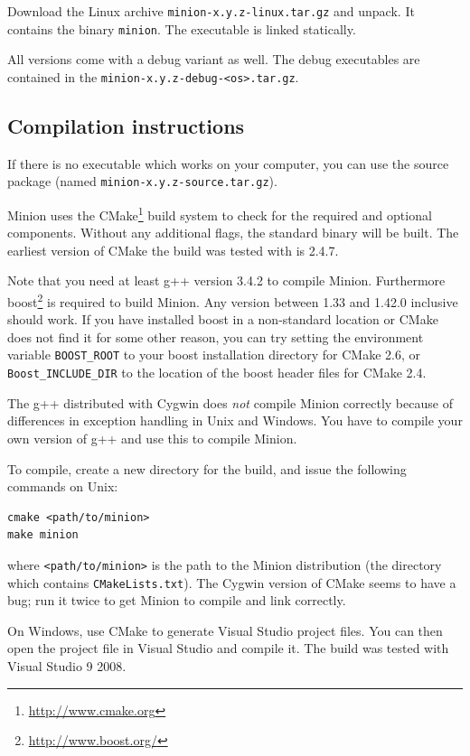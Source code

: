 \documentclass[oneside]{book}
\begin{document}
Download the Linux archive \texttt{minion-x.y.z-linux.tar.gz} and unpack. It contains
the binary \texttt{minion}. The executable is linked statically.

\bigskip

All versions come with a debug variant as well. The debug executables are
contained in the \texttt{minion-x.y.z-debug-<os>.tar.gz}.


\subsection{Compilation instructions}

If there is no executable which works on your computer, you can use
the source package (named \texttt{minion-x.y.z-source.tar.gz}).

Minion uses the CMake\footnote{\url{http://www.cmake.org}} build system to check
for the required and optional components. Without any additional flags, the
standard binary will be built. The earliest version of CMake the build was
tested with is 2.4.7.

Note that you need at least g++ version 3.4.2 to compile Minion. Furthermore
boost\footnote{\url{http://www.boost.org/}} is required to build Minion. Any
version between 1.33 and 1.42.0 inclusive should work. If you have installed
boost in a non-standard location or CMake does not find it for some other
reason, you can try setting the environment variable \verb+BOOST_ROOT+ to your
boost installation directory for CMake 2.6, or \verb+Boost_INCLUDE_DIR+ to the
location of the boost header files for CMake 2.4.

The g++ distributed with Cygwin does \emph{not} compile Minion correctly because
of differences in exception handling in Unix and Windows. You have to compile
your own version of g++ and use this to compile Minion.

To compile, create a new directory for the build, and issue the
following commands on Unix:

\begin{verbatim}
cmake <path/to/minion>
make minion
\end{verbatim}

where \verb+<path/to/minion>+ is the path to the Minion distribution (the
directory which contains \verb+CMakeLists.txt+). The Cygwin version of CMake
seems to have a bug; run it twice to get Minion to compile and link correctly.

On Windows, use CMake to generate Visual Studio project files. You can then open
the project file in Visual Studio and compile it. The build was tested with Visual
Studio 9 2008.
\end{document}
